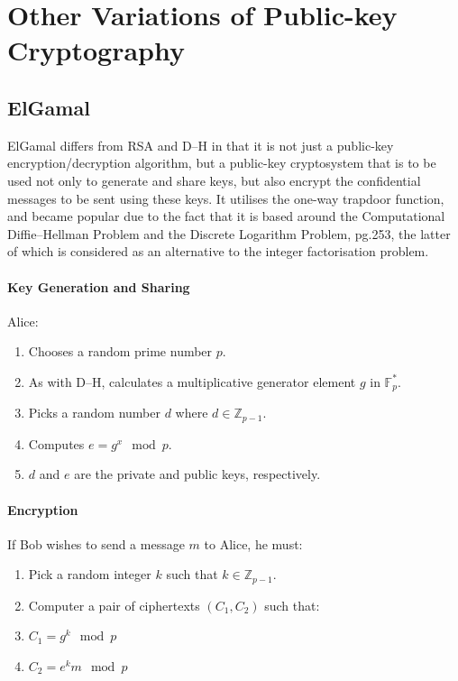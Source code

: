 \section{Other Variations of Public-key Cryptography}

  \subsection{ElGamal}
  
  ElGamal differs from RSA and D--H in that it is not just a public-key encryption/decryption algorithm, but a public-key cryptosystem that is to be used not only to generate and share keys, but also encrypt the confidential messages to be sent using these keys. It utilises the one-way trapdoor function, and became popular due to the fact that it is based around the Computational Diffie--Hellman Problem and the Discrete Logarithm Problem, \cite{Mao:2003uq} \textsection pg.253, the latter of which is considered as an alternative to the integer factorisation problem.
  
  \paragraph{Key Generation and Sharing}
  
  Alice:
  
  \begin{enumerate}
    \item Chooses a random prime number $p$.
    \item As with D--H, calculates a multiplicative generator element $g$ in $\mathbb{F}_p^*$.
    \item Picks a random number $d$ where $d \in \mathbb{Z}_{p-1}$.
    \item Computes $e = g^x\mod p$.
    \item $d$ and $e$ are the private and public keys, respectively.
  \end{enumerate}
  
  \paragraph{Encryption}
  
  If Bob wishes to send a message $m$ to Alice,  he must:
  
  \begin{enumerate}
    \item Pick a random integer $k$ such that $k \in \mathbb{Z}_{p-1}$.
    \item Computer a pair of ciphertexts $(C_1,C_2)$ such that:
    \item $C_1 = g^k \mod p$
    \item $C_2 = e^km \mod p$
  \end{enumerate}
  
